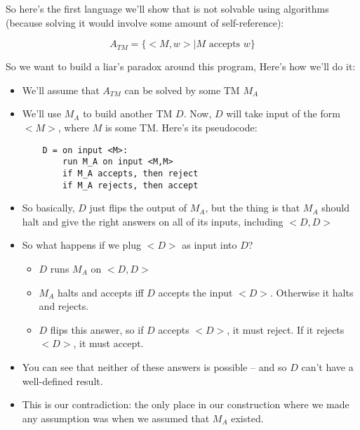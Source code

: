 \documentclass[12pt]{article}
\begin{document}
So here's the first language we'll show that is not solvable using algorithms (because solving it would involve some amount of self-reference):

$$A_{TM} = \{ <M,w> | M \text{ accepts }w \}$$

So we want to build a liar's paradox around this program,  Here's how we'll do it:

\begin{itemize}
    \item We'll assume that $A_{TM}$ can be solved by some TM $M_A$
    \item{We'll use $M_A$ to build another TM $D$. Now, $D$ will take input of the form $<M>$, where $M$ is some TM. Here's its pseudocode:
    \begin{lstlisting}
    D = on input <M>:
        run M_A on input <M,M>
        if M_A accepts, then reject
        if M_A rejects, then accept
    \end{lstlisting}}
    \item So basically, $D$ just flips the output of $M_A$, but the thing is that $M_A$ should halt and give the right answers on all of its inputs, including $<D,D>$
    \item So what happens if we plug $<D>$ as input into $D$?
    \begin{itemize}
        \item $D$ runs $M_A$ on $<D,D>$
        \item $M_A$ halts and accepts iff $D$ accepts the input $<D>$. Otherwise it halts and rejects.
        \item $D$ flips this answer, so if $D$ accepts $<D>$, it must reject. If it rejects $<D>$, it must accept.
    \end{itemize}
    \item You can see that neither of these answers is possible -- and so $D$ can't have a well-defined result.
    \item This is our contradiction: the only place in our construction where we made any assumption was when we assumed that $M_A$ existed.
\end{itemize}
\end{document}

